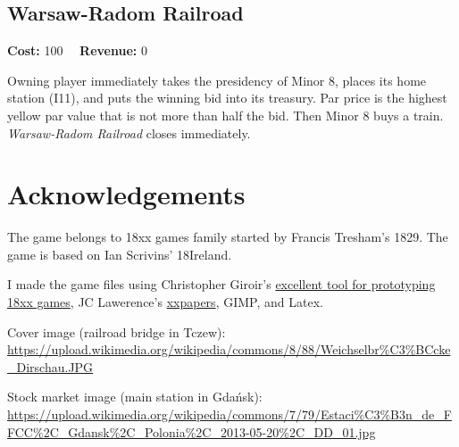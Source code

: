 \documentclass[10pt,a4paper,twocolumn]{article}
\begin{document}
\subsection{Warsaw-Radom Railroad}

\textbf{Cost:} 100 ~~\textbf{Revenue:} 0

Owning player immediately takes the presidency of Minor 8, places its home station (I11), and puts the winning bid into its treasury. Par price is the highest yellow par value that is not more than half the bid. Then Minor 8 buys a train. \textit{Warsaw-Radom Railroad} closes immediately.

\section{Acknowledgements}

The game belongs to 18xx games family started by Francis Tresham's 1829. The game is based on Ian Scrivins' 18Ireland.

I made the game files using Christopher Giroir's \href{https://github.com/kelsin/18xx}{excellent tool for prototyping 18xx games}, JC Lawerence's \href{https://github.com/clearclaw/xxpaper}{xxpapers}, GIMP, and Latex.

Cover image (railroad bridge in Tczew): \url{https://upload.wikimedia.org/wikipedia/commons/8/88/Weichselbr\%C3\%BCcke_Dirschau.JPG}

Stock market image (main station in Gdańsk): \url{https://upload.wikimedia.org/wikipedia/commons/7/79/Estaci\%C3\%B3n_de_FFCC\%2C_Gdansk\%2C_Polonia\%2C_2013-05-20\%2C_DD_01.jpg}
\end{document}
